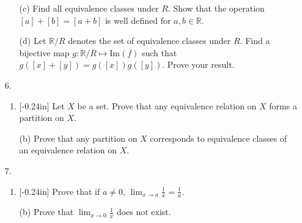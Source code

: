 \documentclass[letterpaper,12pt]{article}
\theoremstyle{definition}
\begin{document}
\pagebreak
\begin{enumerate}
    \item[] \begin{enumerate}
        \item[(c)] Find all equivalence classes under $R$. Show that the operation $[a] + [b] = [a+b]$ is well defined for $a,b \in \mathbb{R}$.
    \end{enumerate}
\end{enumerate}
\pagebreak
\begin{enumerate}
    \item[] \begin{enumerate}
        \item[(d)] Let $\mathbb{R}/R$ denotes the set of equivalence classes under $R$. Find a bijective map $g : \mathbb{R}/R \mapsto \mathrm{Im}(f)$ such that $g([x] + [y]) = g([x])g([y])$. Prove your result.
    \end{enumerate}
\end{enumerate}
\pagebreak
\begin{enumerate}
    \item[6.]  \begin{enumerate}
    \item \reversemarginpar{}[-0.24in] 
Let $X$ be a set. Prove that any equivalence relation on $X$ forms a partition on $X$.
\end{enumerate}
\end{enumerate}
\pagebreak
\begin{enumerate}
    \item[] \begin{enumerate}
        \item[(b)] Prove that any partition on $X$ corresponds to equivalence classes of an equivalence relation on $X$.
    \end{enumerate}
\end{enumerate}
\pagebreak
\begin{enumerate}
    \item[7.] \begin{enumerate}
        \item \reversemarginpar{}[-0.24in] Prove that if $a \neq 0$, $\lim_{x \rightarrow a} \frac{1}{x} = \frac{1}{a}$.
    \end{enumerate}
\end{enumerate}
\pagebreak
\begin{enumerate}
    \item[] \begin{enumerate}
        \item[(b)] Prove that $\lim_{x \rightarrow 0} \frac{1}{x}$ does not exist.
    \end{enumerate}
\end{enumerate}
\end{document}
